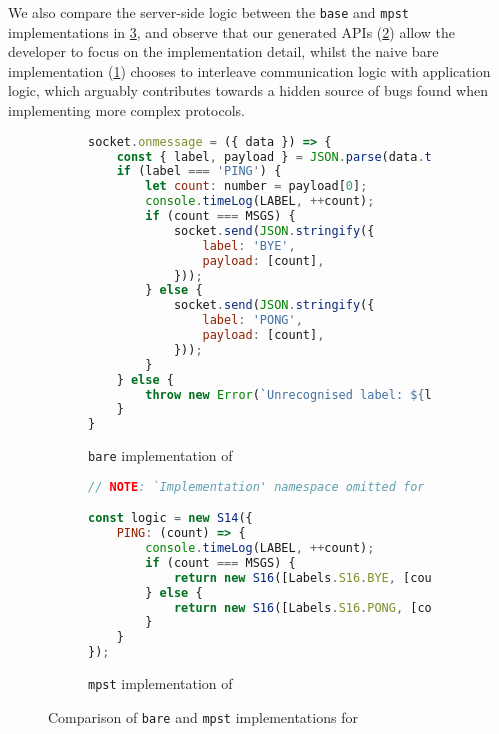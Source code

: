 We also compare the server-side logic between the \texttt{base} and
\texttt{mpst} implementations in \cref{fig:nodepingpong}, and observe
that our generated APIs (\cref{lst:nodepingpongmpst}) 
allow the developer to focus on the
implementation detail, whilst the naive bare implementation 
(\cref{lst:nodepingpongbare}) chooses to interleave communication logic
with application logic, which arguably contributes towards a hidden
source of bugs found when implementing more complex protocols.

\begin{figure}[!ht]
\centering
\begin{subfigure}[b]{\textwidth}
\centering
\begin{lstlisting}[language=javascript,tabsize=2]
socket.onmessage = ({ data }) => {
	const { label, payload } = JSON.parse(data.toString());
	if (label === 'PING') {
		let count: number = payload[0];
		console.timeLog(LABEL, ++count);
		if (count === MSGS) {
			socket.send(JSON.stringify({
				label: 'BYE',
				payload: [count],
			}));
		} else {
			socket.send(JSON.stringify({
				label: 'PONG',
				payload: [count],
			}));
		}
	} else {
		throw new Error(`Unrecognised label: ${label}`);
	}
}
\end{lstlisting}
\caption{\texttt{bare} implementation of  }
\label{lst:nodepingpongbare}
\end{subfigure}
\hfill
\begin{subfigure}[b]{\textwidth}
\centering
\begin{lstlisting}[language=javascript,tabsize=2]
// NOTE: `Implementation' namespace omitted for brevity.

const logic = new S14({
	PING: (count) => {
		console.timeLog(LABEL, ++count);
		if (count === MSGS) {
			return new S16([Labels.S16.BYE, [count], new S15()]);
		} else {
			return new S16([Labels.S16.PONG, [count], logic]);
		}
 	}
});
\end{lstlisting}
\caption{\texttt{mpst} implementation of  }
\label{lst:nodepingpongmpst}
\end{subfigure}
\caption{Comparison of \texttt{bare} and \texttt{mpst}
implementations for  }
\label{fig:nodepingpong}
\end{figure}